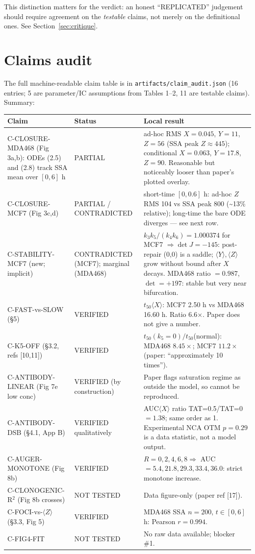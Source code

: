 \documentclass[11pt]{article}
\begin{document}
This distinction matters for the verdict: an honest ``REPLICATED'' judgement should require
agreement on the \emph{testable} claims, not merely on the definitional ones. See
Section~\ref{sec:critique}.

\section{Claims audit}\label{sec:claims}

The full machine-readable claim table is in \texttt{artifacts/claim\_audit.json} (16 entries;
5 are parameter/IC assumptions from Tables 1--2, 11 are testable claims). Summary:

\begin{longtable}{@{}p{3.8cm} p{2.2cm} p{7.5cm}@{}}
\toprule
\textbf{Claim} & \textbf{Status} & \textbf{Local result} \\
\midrule
C-CLOSURE-MDA468 (Fig 3a,b): ODEs (2.5) and (2.8) track SSA mean over $[0,6]$ h & PARTIAL &
  ad-hoc RMS $X{=}0.045$, $Y{=}11$, $Z{=}56$ (SSA peak $Z\approx 445$); conditional
  $X{=}0.063$, $Y{=}17.8$, $Z{=}90$. Reasonable but noticeably looser than paper's plotted overlay. \\
C-CLOSURE-MCF7 (Fig 3c,d) & PARTIAL / CONTRADICTED & short-time $[0,0.6]$ h: ad-hoc $Z$
  RMS 104 vs SSA peak 800 (\textasciitilde{}13\% relative); long-time the bare ODE diverges
  --- see next row. \\
C-STABILITY-MCF7 (new; implicit) & CONTRADICTED (MCF7); marginal (MDA468) &
  $k_3 k_5/(k_4 k_6) = 1.000374$ for MCF7 $\Rightarrow \det J = -145$: post-repair (0,0) is a
  saddle; $\langle Y\rangle, \langle Z\rangle$ grow without bound after $X$ decays.
  MDA468 ratio $= 0.987$, $\det = +197$: stable but very near bifurcation. \\
C-FAST-vs-SLOW (\S5) & VERIFIED & $t_{50}\langle X\rangle$: MCF7 2.50 h vs MDA468 16.60 h.
  Ratio 6.6$\times$. Paper does not give a number. \\
C-K5-OFF (\S3.2, refs [10,11]) & VERIFIED & $t_{50}(k_5{=}0)/t_{50}$(normal): MDA468 $8.45\times$;
  MCF7 $11.2\times$ (paper: ``approximately 10 times''). \\
C-ANTIBODY-LINEAR (Fig 7e low conc) & VERIFIED (by construction) & Paper flags saturation
  regime as outside the model, so cannot be reproduced. \\
C-ANTIBODY-DSB (\S4.1, App B) & VERIFIED qualitatively & AUC$\langle X\rangle$ ratio
  TAT=0.5/TAT=0 $= 1.38$; same order as 1. Experimental NCA OTM $p = 0.29$ is a data
  statistic, not a model output. \\
C-AUGER-MONOTONE (Fig 8b) & VERIFIED & $R=0,2,4,6,8 \Rightarrow$ AUC $= 5.4, 21.8, 29.3,
  33.4, 36.0$: strict monotone increase. \\
C-CLONOGENIC-R$^2$ (Fig 8b crosses) & NOT TESTED & Data figure-only (paper ref [17]). \\
C-FOCI-vs-$\langle Z\rangle$ (\S3.3, Fig 5) & VERIFIED & MDA468 SSA $n{=}200$, $t\in[0,6]$ h:
  Pearson $r = 0.994$. \\
C-FIG4-FIT & NOT TESTED & No raw data available; blocker \#1. \\
\bottomrule
\end{longtable}
\end{document}
